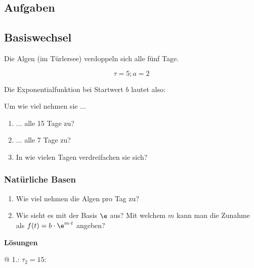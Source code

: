 \subsection*{Aufgaben}


\newpage



\subsection{Basiswechsel}
Die Algen (im Türlersee) verdoppeln sich alle fünf Tage.

$$\tau = 5; a= 2$$

Die Exponentialfunktion bei Startwert $b$ lautet also:



Um wie viel nehmen sie ...

\begin{enumerate}
\item ... alle 15 Tage zu?
\item ... alle 7 Tage zu?
\item In wie vielen Tagen verdreifachen sie sich?
\end{enumerate}
\subsubsection{Natürliche Basen}

\begin{enumerate}[resume]
\item Wie viel nehmen die Algen pro Tag zu?
\item Wie sieht es mit der Basis $\e$ aus? Mit welchem $m$ kann man die
  Zunahme als $f(t) = b \cdot{} \e^{m\cdot{}t}$ angeben?
\end{enumerate}
\newpage


\textbf{Lösungen}

@ 1.: $\tau_2=15$:

